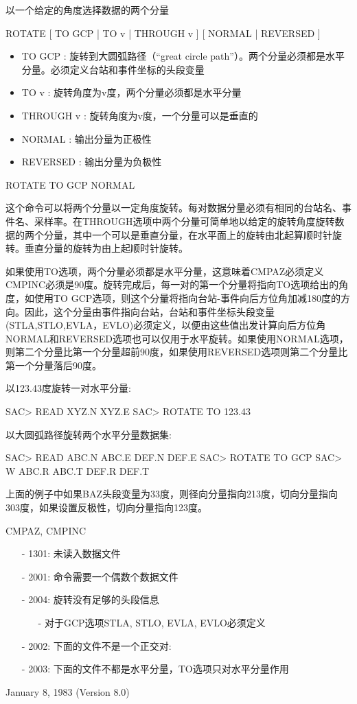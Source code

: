 \label{cmd:rotate}

以一个给定的角度选择数据的两个分量

ROTATE [ TO GCP | TO v | THROUGH v ] [ NORMAL | REVERSED ]

\begin{itemize}
\item TO GCP : 旋转到大圆弧路径（``great circle path''）。两个分量必须都是水平分量。必须定义台站和事件坐标的头段变量 
\item TO v : 旋转角度为v度，两个分量必须都是水平分量 
\item THROUGH v : 旋转角度为v度，一个分量可以是垂直的 
\item NORMAL : 输出分量为正极性 
\item REVERSED : 输出分量为负极性 
\end{itemize}

ROTATE TO GCP NORMAL

这个命令可以将两个分量以一定角度旋转。每对数据分量必须有相同的台站名、事件名、采样率。在THROUGH选项中两个分量可简单地以给定的旋转角度旋转数据的两个分量，其中一个可以是垂直分量，在水平面上的旋转由北起算顺时针旋转。垂直分量的旋转为由上起顺时针旋转。

如果使用TO选项，两个分量必须都是水平分量，这意味着CMPAZ必须定义CMPINC必须是90度。旋转完成后，每一对的第一个分量将指向TO选项给出的角度，如使用TO GCP选项，则这个分量将指向台站-事件向后方位角加减180度的方向。因此，这个分量由事件指向台站，台站和事件坐标头段变量(STLA,STLO,EVLA，EVLO)必须定义，以便由这些值出发计算向后方位角NORMAL和REVERSED选项也可以仅用于水平旋转。如果使用NORMAL选项，则第二个分量比第一个分量超前90度，如果使用REVERSED选项则第二个分量比第一个分量落后90度。

以123.43度旋转一对水平分量:
\begin{SACCode}
SAC> READ XYZ.N XYZ.E
SAC> ROTATE TO 123.43
\end{SACCode}
以大圆弧路径旋转两个水平分量数据集:
\begin{SACCode}
SAC> READ ABC.N ABC.E DEF.N DEF.E
SAC> ROTATE TO GCP
SAC> W ABC.R ABC.T DEF.R DEF.T
\end{SACCode}
上面的例子中如果BAZ头段变量为33度，则径向分量指向213度，切向分量指向303度，如果设置反极性，切向分量指向123度。

CMPAZ, CMPINC

\begin{itemize}
\item[-]1301: 未读入数据文件
\item[-]2001: 命令需要一个偶数个数据文件
\item[-]2004: 旋转没有足够的头段信息
	\begin{itemize}
	\item[-]对于GCP选项STLA, STLO, EVLA, EVLO必须定义
	\end{itemize}
\item[-]2002: 下面的文件不是一个正交对:
\item[-]2003: 下面的文件不都是水平分量，TO选项只对水平分量作用
\end{itemize}

January 8, 1983 (Version 8.0)
